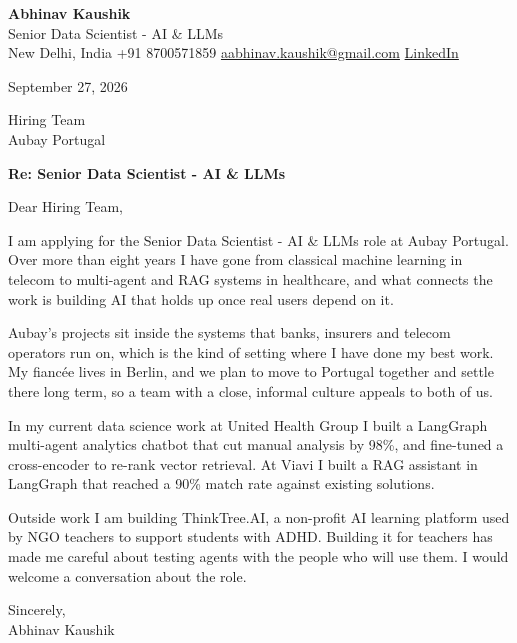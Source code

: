 \documentclass[11pt,a4paper]{article}
\begin{document}
{\Large\bfseries Abhinav Kaushik}\\
Senior Data Scientist - AI \& LLMs\\
New Delhi, India \textbar{} +91 8700571859 \textbar{} \href{mailto:aabhinav.kaushik@gmail.com}{aabhinav.kaushik@gmail.com} \textbar{} \href{https://www.linkedin.com/in/abhinav-kaushik10/}{LinkedIn}  

September 27, 2026

Hiring Team\\
Aubay Portugal

\textbf{Re: Senior Data Scientist - AI \& LLMs}

Dear Hiring Team,

I am applying for the Senior Data Scientist - AI \& LLMs role at Aubay Portugal. Over more than eight years I have gone from classical machine learning in telecom to multi-agent and RAG systems in healthcare, and what connects the work is building AI that holds up once real users depend on it.

Aubay's projects sit inside the systems that banks, insurers and telecom operators run on, which is the kind of setting where I have done my best work. My fiancée lives in Berlin, and we plan to move to Portugal together and settle there long term, so a team with a close, informal culture appeals to both of us.

In my current data science work at United Health Group I built a LangGraph multi-agent analytics chatbot that cut manual analysis by 98\%, and fine-tuned a cross-encoder to re-rank vector retrieval. At Viavi I built a RAG assistant in LangGraph that reached a 90\% match rate against existing solutions.

Outside work I am building ThinkTree.AI, a non-profit AI learning platform used by NGO teachers to support students with ADHD. Building it for teachers has made me careful about testing agents with the people who will use them. I would welcome a conversation about the role.

Sincerely,\\[4pt]
Abhinav Kaushik
\end{document}
